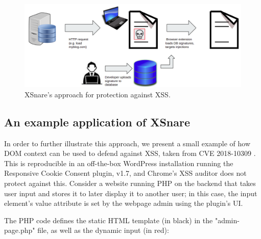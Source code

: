  \begin{figure}[h]
 	\includegraphics[scale=0.23]{img/dom_firewall.png}
 	\caption{XSnare's approach for protection against XSS.}
 	\label{fig:dom_firewall}
 \end{figure}

\subsection{An example application of XSnare}

In order to further illustrate this approach, we present a small example of how DOM context can be used to defend against XSS, taken from CVE 2018-10309 \cite{examplecve}. This is reproducible in an off-the-box WordPress installation running the Responsive Cookie Consent plugin, v1.7, and Chrome's XSS auditor does not protect against this. Consider a website running PHP on the backend that takes user input and stores it to later display it to another user; in this case, the input element's value attribute is set by the webpage admin using the plugin's UI.

The PHP code defines the static HTML template (in black) in the "admin-page.php" file, as well as the dynamic input (in red):

